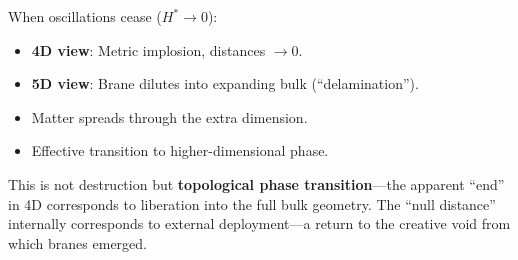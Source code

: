 When oscillations cease ($H^* \to 0$):
\begin{itemize}
  \item \textbf{4D view}: Metric implosion, distances $\to 0$.
  \item \textbf{5D view}: Brane dilutes into expanding bulk (``delamination'').
  \item Matter spreads through the extra dimension.
  \item Effective transition to higher-dimensional phase.
\end{itemize}

This is not destruction but \textbf{topological phase transition}---the apparent ``end'' in 4D corresponds to liberation into the full bulk geometry. The ``null distance'' internally corresponds to external deployment---a return to the creative void from which branes emerged.
